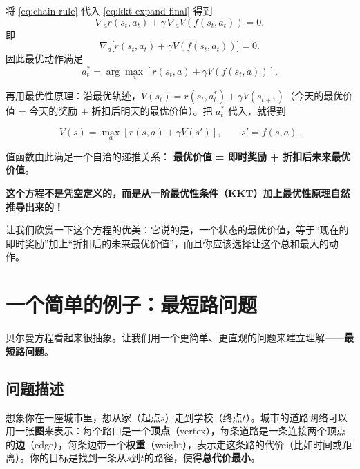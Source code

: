 将 \eqref{eq:chain-rule} 代入 \eqref{eq:kkt-expand-final} 得到
\begin{equation}
    \nabla_a r(s_t,a_t)
    +\gamma\,\nabla_a V(f(s_t,a_t))
    =0.
\end{equation}
即
\begin{equation}
    \nabla_a\Big[
        r(s_t,a_t) 
        +\gamma V(f(s_t,a_t))
    \Big]
    =0.
\end{equation}
因此最优动作满足
\begin{equation}
a_t^*
=
\arg\max_{a}
\left[
r(s_t,a)+\gamma V(f(s_t,a))
\right].
\end{equation}


再用最优性原理：沿最优轨迹，$V(s_t) = r(s_t, a_t^*) + \gamma V(s_{t+1})$（今天的最优价值 = 今天的奖励 + 折扣后明天的最优价值）。把 $a_t^*$ 代入，就得到

\begin{keytheorem}[title=贝尔曼最优方程]
\begin{equation}
    \boxed{
    V(s)
    =
    \max_a
    \left[
        r(s,a)
        +
        \gamma V(s')
    \right]},
    \qquad s'=f(s,a).
\end{equation}
\end{keytheorem}


值函数由此满足一个自洽的递推关系：  
\textbf{最优价值 = 即时奖励 + 折扣后未来最优价值}。



\textbf{这个方程不是凭空定义的，而是从一阶最优性条件（KKT）加上最优性原理自然推导出来的！}

让我们欣赏一下这个方程的优美：它说的是，一个状态的最优价值，等于“现在的即时奖励”加上“折扣后的未来最优价值”，而且你应该选择让这个总和最大的动作。

\section{一个简单的例子：最短路问题}

贝尔曼方程看起来很抽象。让我们用一个更简单、更直观的问题来建立理解——\textbf{最短路问题}。

\subsection{问题描述}

想象你在一座城市里，想从家（起点$s$）走到学校（终点$t$）。城市的道路网络可以用一张\textbf{图}来表示：每个路口是一个\textbf{顶点}（vertex），每条道路是一条连接两个顶点的\textbf{边}（edge），每条边带一个\textbf{权重}（weight），表示走这条路的代价（比如时间或距离）。你的目标是找到一条从$s$到$t$的路径，使得\textbf{总代价最小}。

